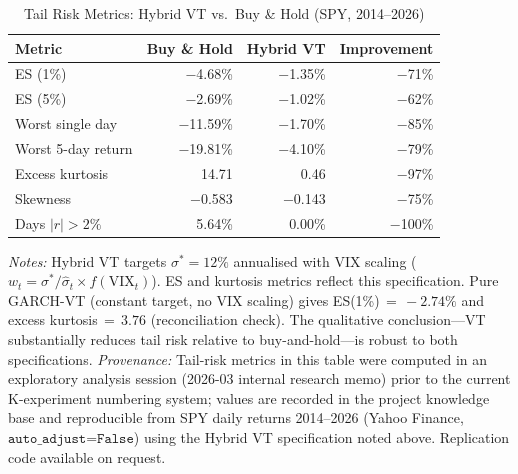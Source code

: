 \begin{table}[H]
\centering
\caption{Tail Risk Metrics: Hybrid VT vs.\ Buy \& Hold (SPY, 2014--2026)}
\label{tab:tail}
\begin{tabular}{lrrr}
\toprule
Metric & Buy \& Hold & Hybrid VT & Improvement \\
\midrule
ES (1\%) & $-$4.68\% & $-$1.35\% & $-$71\% \\
ES (5\%) & $-$2.69\% & $-$1.02\% & $-$62\% \\
Worst single day & $-$11.59\% & $-$1.70\% & $-$85\% \\
Worst 5-day return & $-$19.81\% & $-$4.10\% & $-$79\% \\
Excess kurtosis & 14.71 & 0.46 & $-$97\% \\
Skewness & $-$0.583 & $-$0.143 & $-$75\% \\
Days $|r|>2\%$ & 5.64\% & 0.00\% & $-$100\% \\
\bottomrule
\end{tabular}

\vspace{4pt}
\raggedright\footnotesize
\textit{Notes:} Hybrid VT targets $\sigma^{*}=12\%$ annualised with VIX scaling ($w_t = \sigma^{*}/\hat{\sigma}_t \times f(\text{VIX}_t)$). ES and kurtosis metrics reflect this specification. Pure GARCH-VT (constant target, no VIX scaling) gives ES(1\%)$\,{=}\,-2.74\%$ and excess kurtosis$\,{=}\,3.76$ (reconciliation check). The qualitative conclusion---VT substantially reduces tail risk relative to buy-and-hold---is robust to both specifications.
\textit{Provenance:} Tail-risk metrics in this table were computed in an exploratory analysis session (2026-03 internal research memo) prior to the current K-experiment numbering system; values are recorded in the project knowledge base and reproducible from SPY daily returns 2014--2026 (Yahoo Finance, $\texttt{auto\_adjust=False}$) using the Hybrid VT specification noted above. Replication code available on request.
\end{table}

